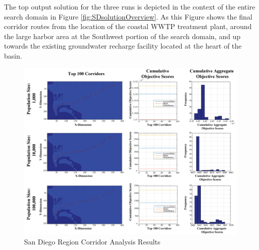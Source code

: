 The top output solution for the three runs is depicted in the context of the entire search domain in Figure \ref{fig:SDsolutionOverview}. As this Figure shows the final corridor routes from the location of the coastal WWTP treatment plant, around the large harbor area at the Southwest portion of the search domain, and up towards the existing groundwater recharge facility located at the heart of the basin. 
    
        \begin{figure}[!h]
            \begin{center}
            \includegraphics[width=6in]{figures/SanDiego_PathwayResults.png}   
            \caption{San Diego Region Corridor Analysis Results}
            \label{fig:SDresults}
            \end{center}
        \end{figure}

